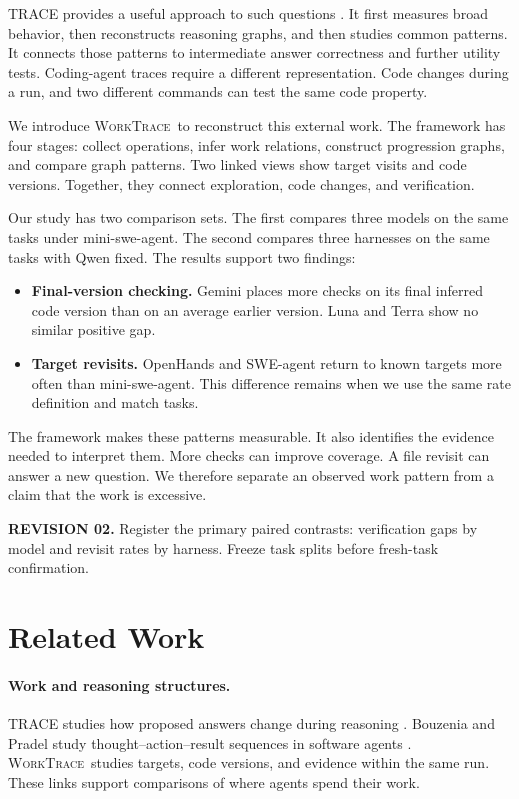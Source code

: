 \documentclass[10pt,a4paper,twocolumn]{article}
\newcommand{\rev}[2]{\par\smallskip\noindent\begin{minipage}{\linewidth}\color{revision}\footnotesize\textbf{REVISION #1.} #2\end{minipage}\par\smallskip}
\newcommand{\wt}{\textsc{WorkTrace}}
\begin{document}
TRACE provides a useful approach to such questions \citep{trace}. It first measures broad behavior, then reconstructs reasoning graphs, and then studies common patterns. It connects those patterns to intermediate answer correctness and further utility tests. Coding-agent traces require a different representation. Code changes during a run, and two different commands can test the same code property.

We introduce \wt\ to reconstruct this external work. The framework has four stages: collect operations, infer work relations, construct progression graphs, and compare graph patterns. Two linked views show target visits and code versions. Together, they connect exploration, code changes, and verification.

Our study has two comparison sets. The first compares three models on the same tasks under mini-swe-agent. The second compares three harnesses on the same tasks with Qwen fixed. The results support two findings:
\begin{itemize}
\setlength{\itemsep}{2pt}\setlength{\topsep}{3pt}
\item \textbf{Final-version checking.} Gemini places more checks on its final inferred code version than on an average earlier version. Luna and Terra show no similar positive gap.
\item \textbf{Target revisits.} OpenHands and SWE-agent return to known targets more often than mini-swe-agent. This difference remains when we use the same rate definition and match tasks.
\end{itemize}
The framework makes these patterns measurable. It also identifies the evidence needed to interpret them. More checks can improve coverage. A file revisit can answer a new question. We therefore separate an observed work pattern from a claim that the work is excessive.
\rev{02}{Register the primary paired contrasts: verification gaps by model and revisit rates by harness. Freeze task splits before fresh-task confirmation.}

\section{Related Work}
\paragraph{Work and reasoning structures.}
TRACE studies how proposed answers change during reasoning \citep{trace}. Bouzenia and Pradel study thought--action--result sequences in software agents \citep{bouzenia}. \wt\ studies targets, code versions, and evidence within the same run. These links support comparisons of where agents spend their work.
\end{document}
